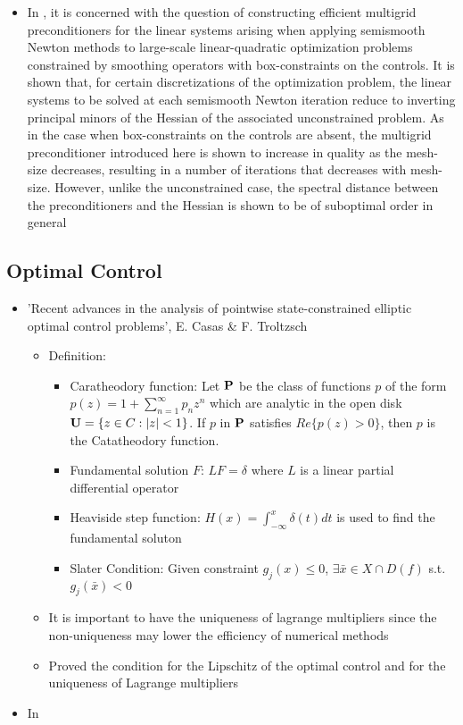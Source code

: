 \documentclass{article}
\begin{document}
\begin{itemize}
\item In \cite{AD}, it is concerned with the question of constructing efficient multigrid preconditioners for the linear systems arising when applying semismooth Newton methods to large-scale linear-quadratic optimization problems constrained by smoothing operators with box-constraints on the controls. It is shown that, for certain discretizations of the optimization problem, the linear systems to be solved at each semismooth Newton iteration reduce to inverting principal minors of the Hessian of the associated unconstrained problem. As in the case when box-constraints on the controls are absent, the multigrid preconditioner introduced here is shown to increase in quality as the mesh-size decreases, resulting in a number of iterations that decreases with mesh-size. However, unlike the unconstrained case, the spectral distance between the preconditioners and the Hessian is shown to be of suboptimal order in general

\end{itemize}


\subsection{Optimal Control}
\begin{itemize}
\item 'Recent advances in the analysis of pointwise state-constrained elliptic optimal control problems', E. Casas \& F. Troltzsch  \cite{ec1}
\begin{itemize}
\item Definition: 
\begin{itemize}
\item Caratheodory function: Let ${\bf P}$ be the class of functions $p$ of the form $p(z)=1+\sum_{n=1}^{\infty}p_n z^{n}$ which are analytic in the open disk ${\bf U}=\{z\in C: |z|<1\}$. If $p$ in ${\bf P}$ satisfies $Re\{p(z)>0\}$, then $p$ is the Catatheodory function.
\item Fundamental solution $F$: $LF=\delta$ where $L$ is a linear partial differential operator
\item Heaviside step function: $H(x)=\int_{-\infty}^{x}\delta (t)dt$ is used to find the fundamental soluton
\item Slater Condition: Given constraint $g_j (x)\leq 0$, $\exists \bar x \in X\cap D(f)$ s.t. $g_j (\bar x)<0$
\end{itemize}
\item It is important to have the uniqueness of lagrange multipliers since the non-uniqueness may lower \cite{M1} the efficiency of numerical methods
\item Proved the condition for the Lipschitz of the optimal control and for the uniqueness of Lagrange multipliers
\end{itemize}

\item In \cite{CA1}
\end{itemize}
\end{document}
